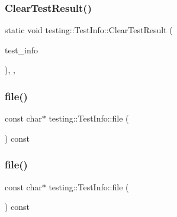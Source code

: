 \subsubsection{\texorpdfstring{ClearTestResult()}{ClearTestResult()}\hspace{0.1cm}{\footnotesize\ttfamily [3/3]}}
{\footnotesize\ttfamily static void testing\+::\+Test\+Info\+::\+Clear\+Test\+Result (\begin{DoxyParamCaption}\item[{\mbox{\hyperlink{classtesting_1_1_test_info}{Test\+Info}} $\ast$}]{test\+\_\+info }\end{DoxyParamCaption})\hspace{0.3cm}{\ttfamily [inline]}, {\ttfamily [static]}, {\ttfamily [private]}}

\mbox{\label{classtesting_1_1_test_info_a9b74d79cf618ce5bb0d0b1da75ee8b35}} 
\subsubsection{\texorpdfstring{file()}{file()}\hspace{0.1cm}{\footnotesize\ttfamily [1/3]}}
{\footnotesize\ttfamily const char$\ast$ testing\+::\+Test\+Info\+::file (\begin{DoxyParamCaption}{ }\end{DoxyParamCaption}) const\hspace{0.3cm}{\ttfamily [inline]}}

\mbox{\label{classtesting_1_1_test_info_a9b74d79cf618ce5bb0d0b1da75ee8b35}} 
\subsubsection{\texorpdfstring{file()}{file()}\hspace{0.1cm}{\footnotesize\ttfamily [2/3]}}
{\footnotesize\ttfamily const char$\ast$ testing\+::\+Test\+Info\+::file (\begin{DoxyParamCaption}{ }\end{DoxyParamCaption}) const\hspace{0.3cm}{\ttfamily [inline]}}

\mbox{\label{classtesting_1_1_test_info_a9b74d79cf618ce5bb0d0b1da75ee8b35}} 
